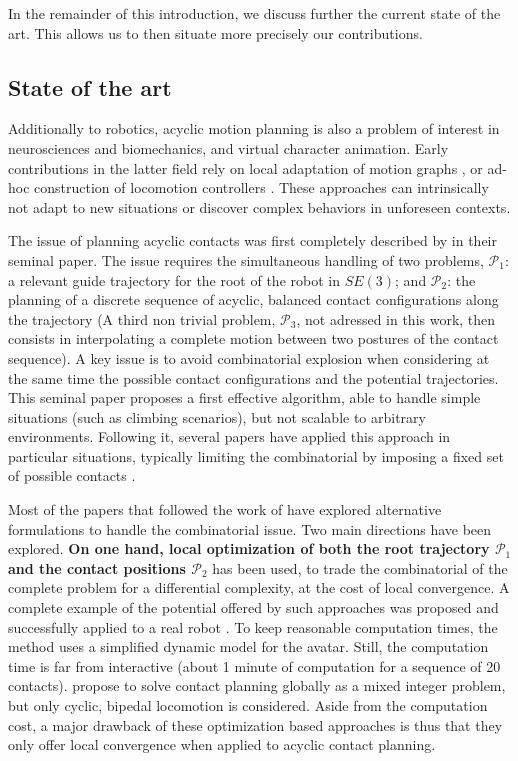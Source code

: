 In the remainder of this introduction, we discuss further the current state of the art. This allows us to then situate more precisely our contributions.

\subsection{State of the art}

\newcommand{\Pa}{$\mathcal{P}_1$ }
\newcommand{\Pb}{$\mathcal{P}_2$ }

Additionally to robotics, acyclic motion planning is also a problem of interest in neurosciences and biomechanics, and virtual character animation.
Early contributions in the latter field rely on local adaptation of motion graphs \citep{citeulike:220163}, or ad-hoc construction of locomotion controllers \citep{Pettre:2003:LPD:846276.846313}. These approaches can intrinsically not adapt to new situations or discover complex behaviors in unforeseen contexts.

The issue of planning acyclic contacts was first completely described by \citeauthor{conf/iser/BretlRLKA04} in their seminal paper. The issue requires the simultaneous handling of two problems, $\mathcal{P}_1$: a relevant guide trajectory for the root of the robot in $SE(3)$; and $\mathcal{P}_2$: the planning of a discrete sequence of acyclic, balanced contact configurations along the trajectory (A third non trivial problem, $\mathcal{P}_3$, not adressed in this work, then consists in interpolating a complete motion between two postures of the contact sequence).  A key issue is to avoid combinatorial explosion when considering at the same time the possible contact configurations and the potential trajectories. This seminal paper proposes a first effective algorithm, able to handle simple situations (such as climbing scenarios), but not scalable to arbitrary environments. Following it, seve\-ral papers have applied this approach in particular situations, typically limiting the combinatorial by imposing a fixed set of possible contacts \citep{Hauser06usingmotion, stilman2010}.

Most of the papers that followed the work of \citeauthor{conf/iser/BretlRLKA04} have explored alternative formulations to handle the combinatorial issue. Two main directions have been explored. \textbf{On one hand, local optimization of both the root trajectory \Pa and the contact positions $\mathcal{P}_2$} has been used, to trade the combinatorial of the complete problem for a differential complexity, at the cost of local convergence. A complete example of the potential offered by such approaches was proposed \citep{Mordatch:2012:DCB:2185520.2185539} and successfully applied to a real robot \citep{mordatch2015}. To keep reasonable computation times, the method uses a simplified dynamic model for the avatar. Still, the computation time is far from interactive  (about 1 minute of computation for a sequence of 20 contacts). \citeauthor{DBLP:conf/humanoids/DeitsT14} propose to solve contact planning globally as a mixed integer problem, but only cyclic, bipedal locomotion is considered. Aside from the computation cost, a major drawback of these optimization based approaches is thus that they only offer local convergence when applied to acyclic contact planning.

